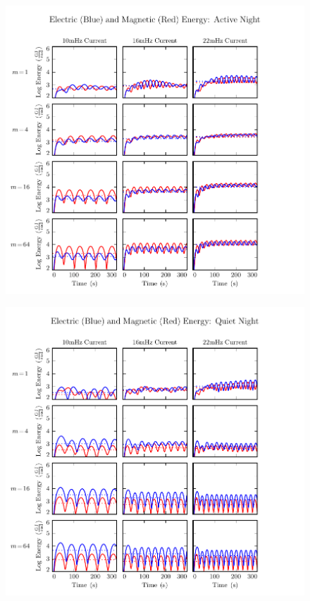 \begin{figure}[H]
    \centering
    \includegraphics[width=\textwidth]{figures/UB_UE_J_3.pdf}
    \caption[Current-Driven Electric and Magnetic Energy: Active Night]{}
    \label{fig_UB_UE_J_3}
\end{figure}

\begin{figure}[H]
    \centering
    \includegraphics[width=\textwidth]{figures/UB_UE_J_4.pdf}
    \caption[Current-Driven Electric and Magnetic Energy: Quiet Night]{}
    \label{fig_UB_UE_J_4}
\end{figure}








